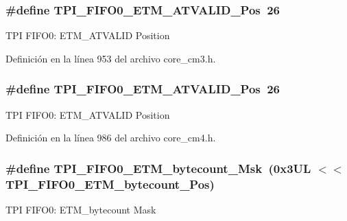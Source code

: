 \subsubsection[{\texorpdfstring{T\+P\+I\+\_\+\+F\+I\+F\+O0\+\_\+\+E\+T\+M\+\_\+\+A\+T\+V\+A\+L\+I\+D\+\_\+\+Pos}{TPI_FIFO0_ETM_ATVALID_Pos}}]{\setlength{\rightskip}{0pt plus 5cm}\#define T\+P\+I\+\_\+\+F\+I\+F\+O0\+\_\+\+E\+T\+M\+\_\+\+A\+T\+V\+A\+L\+I\+D\+\_\+\+Pos~26}\hypertarget{group___c_m_s_i_s___t_p_i_ga7fdeb3e465ca4aa9e3b2f424ab3bbd1d}{}\label{group___c_m_s_i_s___t_p_i_ga7fdeb3e465ca4aa9e3b2f424ab3bbd1d}
T\+PI F\+I\+F\+O0\+: E\+T\+M\+\_\+\+A\+T\+V\+A\+L\+ID Position 

Definición en la línea 953 del archivo core\+\_\+cm3.\+h.

\subsubsection[{\texorpdfstring{T\+P\+I\+\_\+\+F\+I\+F\+O0\+\_\+\+E\+T\+M\+\_\+\+A\+T\+V\+A\+L\+I\+D\+\_\+\+Pos}{TPI_FIFO0_ETM_ATVALID_Pos}}]{\setlength{\rightskip}{0pt plus 5cm}\#define T\+P\+I\+\_\+\+F\+I\+F\+O0\+\_\+\+E\+T\+M\+\_\+\+A\+T\+V\+A\+L\+I\+D\+\_\+\+Pos~26}\hypertarget{group___c_m_s_i_s___t_p_i_ga7fdeb3e465ca4aa9e3b2f424ab3bbd1d}{}\label{group___c_m_s_i_s___t_p_i_ga7fdeb3e465ca4aa9e3b2f424ab3bbd1d}
T\+PI F\+I\+F\+O0\+: E\+T\+M\+\_\+\+A\+T\+V\+A\+L\+ID Position 

Definición en la línea 986 del archivo core\+\_\+cm4.\+h.

\subsubsection[{\texorpdfstring{T\+P\+I\+\_\+\+F\+I\+F\+O0\+\_\+\+E\+T\+M\+\_\+bytecount\+\_\+\+Msk}{TPI_FIFO0_ETM_bytecount_Msk}}]{\setlength{\rightskip}{0pt plus 5cm}\#define T\+P\+I\+\_\+\+F\+I\+F\+O0\+\_\+\+E\+T\+M\+\_\+bytecount\+\_\+\+Msk~(0x3\+U\+L $<$$<$ T\+P\+I\+\_\+\+F\+I\+F\+O0\+\_\+\+E\+T\+M\+\_\+bytecount\+\_\+\+Pos)}\hypertarget{group___c_m_s_i_s___t_p_i_gad2536b3a935361c68453cd068640af92}{}\label{group___c_m_s_i_s___t_p_i_gad2536b3a935361c68453cd068640af92}
T\+PI F\+I\+F\+O0\+: E\+T\+M\+\_\+bytecount Mask 

